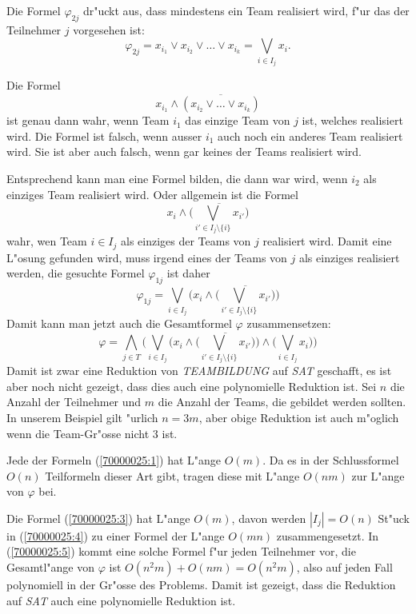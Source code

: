 \begin{loesung}
Die Formel $\varphi_{2j}$ dr"uckt aus, dass mindestens ein Team realisiert
wird, f"ur das der Teilnehmer $j$ vorgesehen ist:
\begin{equation}
\varphi_{2j}=x_{i_1}\vee x_{i_2}\vee\dots\vee x_{i_k} = \bigvee_{i\in I_j}x_i.
\label{70000025:1}
\end{equation}

Die Formel
\begin{equation}
x_{i_1}\wedge\overline{(x_{i_2}\vee\dots\vee x_{i_k})}
\label{70000025:2}
\end{equation}
ist genau dann wahr, wenn Team $i_1$ das einzige Team von $j$ ist,
welches realisiert wird. Die Formel ist falsch, wenn ausser $i_1$ auch
noch ein anderes Team realisiert wird. Sie ist aber auch falsch, wenn 
gar keines der Teams realisiert wird.

Entsprechend kann man eine Formel bilden, die dann war wird, wenn $i_2$ als 
einziges Team realisiert wird. Oder allgemein ist
die Formel
\begin{equation}
x_i\wedge \overline{\biggl(\bigvee_{i'\in I_j\setminus\{i\}}x_{i'}\biggr)}
\label{70000025:3}
\end{equation}
wahr, wen Team $i\in I_j$ als einziges der Teams von $j$ realisiert wird.
Damit eine L"osung gefunden wird, muss irgend eines der Teams von $j$ als
einziges realisiert werden,
die gesuchte Formel $\varphi_{1j}$ ist daher
\begin{equation}
\varphi_{1j} = 
\bigvee_{i\in I_j} \biggl(x_i\wedge
	\overline{\biggl(\bigvee_{i'\in I_j\setminus \{i\}}x_{i'}\biggr)}\biggr)
\label{70000025:4}
\end{equation}
Damit kann man jetzt auch die Gesamtformel $\varphi$ zusammensetzen:
\begin{equation}
\varphi=
\bigwedge_{j\in T}
\biggl(
\bigvee_{i\in I_j} \biggl(x_i\wedge
	\overline{\biggl(\bigvee_{i'\in I_j\setminus \{i\}}x_{i'}\biggr)}\biggr)
\wedge
\biggl(
\bigvee_{i\in I_j}x_i
\biggr)
\biggr)
\label{70000025:5}
\end{equation}
Damit ist zwar eine Reduktion von \textsl{TEAMBILDUNG} auf \textsl{SAT}
geschafft, es ist aber noch nicht gezeigt, dass dies auch eine polynomielle
Reduktion ist. Sei $n$ die Anzahl der Teilnehmer und $m$ die Anzahl der
Teams, die gebildet werden sollten. In unserem Beispiel gilt "urlich $n=3m$,
aber obige Reduktion ist auch m"oglich wenn die Team-Gr"osse nicht $3$
ist.

Jede der Formeln (\ref{70000025:1}) hat L"ange $O(m)$.
Da es in der Schlussformel $O(n)$ Teilformeln dieser Art gibt, 
tragen diese mit L"ange $O(nm)$ zur L"ange von $\varphi$ bei.

Die Formel (\ref{70000025:3}) hat L"ange $O(m)$, davon werden $|I_j|=O(n)$
St"uck
in (\ref{70000025:4}) zu einer Formel der L"ange $O(mn)$ zusammengesetzt.
In (\ref{70000025:5}) kommt eine solche Formel f"ur jeden Teilnehmer vor,
die Gesamtl"ange von $\varphi$ ist $O(n^2m) + O(nm)=O(n^2m)$, also auf
jeden Fall polynomiell in der Gr"osse des Problems. Damit ist gezeigt,
dass die Reduktion auf \textsl{SAT} auch eine polynomielle Reduktion ist.
\end{loesung}


